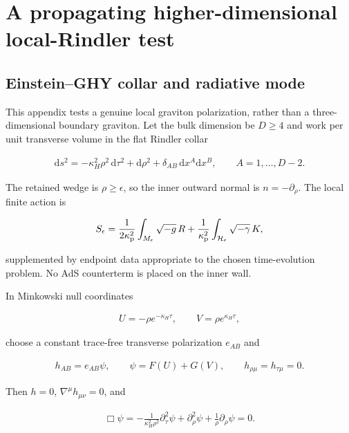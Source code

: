 \section{A propagating higher-dimensional local-Rindler test}\label{app:higher-dimensional-rindler}

\subsection{Einstein--GHY collar and radiative mode}\label{subsec:rindler-radiative-mode}

This appendix tests a genuine local graviton polarization, rather than a three-dimensional boundary graviton. Let the bulk dimension be $D\geq4$ and work per unit transverse volume in the flat Rindler collar

\begin{align}
\mathrm ds^2
=-\kappa_H^2\rho^2\,\mathrm d\tau^2+\mathrm d\rho^2
+\delta_{AB}\,\mathrm dx^A\mathrm dx^B,
\qquad A=1,\ldots,D-2.
\end{align}

The retained wedge is $\rho\geq\epsilon$, so the inner outward normal is $n=-\partial_\rho$. The local finite action is

\begin{align}
S_\epsilon
=\frac1{2\kappa_{\rm p}^2}\int_{M_\epsilon}\sqrt{-g}\,R
+\frac1{\kappa_{\rm p}^2}\int_{\mathcal H_\epsilon}
\sqrt{-\gamma}\,K,
\end{align}

supplemented by endpoint data appropriate to the chosen time-evolution problem. No AdS counterterm is placed on the inner wall.

In Minkowski null coordinates

\begin{align}
U=-\rho e^{-\kappa_H\tau},
\qquad
V=\rho e^{\kappa_H\tau},
\end{align}

choose a constant trace-free transverse polarization $e_{AB}$ and

\begin{align}
h_{AB}=e_{AB}\psi,
\qquad
\psi=F(U)+G(V),
\qquad
h_{\rho\mu}=h_{\tau\mu}=0.
\end{align}

Then $h=0$, $\nabla^\mu h_{\mu\nu}=0$, and

\begin{align}
\Box\psi
=-\frac1{\kappa_H^2\rho^2}\partial_\tau^2\psi
+\partial_\rho^2\psi+\frac1\rho\partial_\rho\psi
=0.
\end{align}

